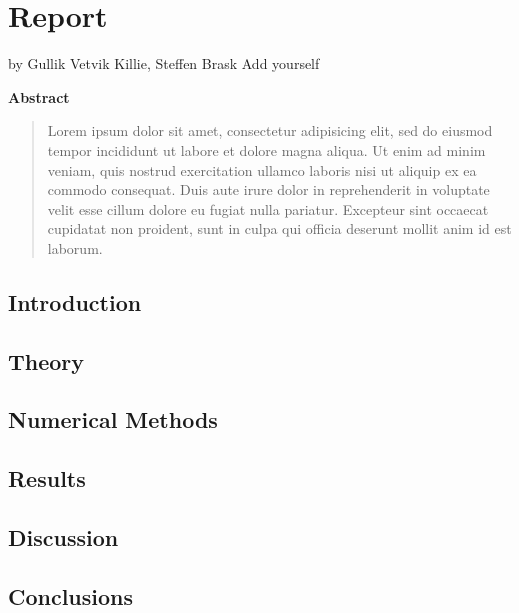 \documentclass[captions=tableheading,twoside]{scrbook}
\newcommand{\agfauthor}[1]{%
	\begin{center}by #1\end{center}}
\newenvironment{Abstract}{\begin{center}\textbf{Abstract}\end{center}%
	\begin{quote}}{\end{quote}}
\begin{document}
\chapter{Report}
\agfauthor{Gullik Vetvik Killie, Steffen Brask \large{Add yourself}}

\begin{Abstract}
	Lorem ipsum dolor sit amet, consectetur adipisicing elit, sed do eiusmod
	tempor incididunt ut labore et dolore magna aliqua. Ut enim ad minim veniam,
	quis nostrud exercitation ullamco laboris nisi ut aliquip ex ea commodo consequat.
 	Duis aute irure dolor in reprehenderit in voluptate velit esse cillum dolore eu
	fugiat nulla pariatur. Excepteur sint occaecat cupidatat non proident, sunt in
	culpa qui officia deserunt mollit anim id est laborum.
\end{Abstract}

\section{Introduction}


\section{Theory}


\section{Numerical Methods}


\section{Results}


\section{Discussion}



\section{Conclusions}



% 
\printbibliography
\end{document}
